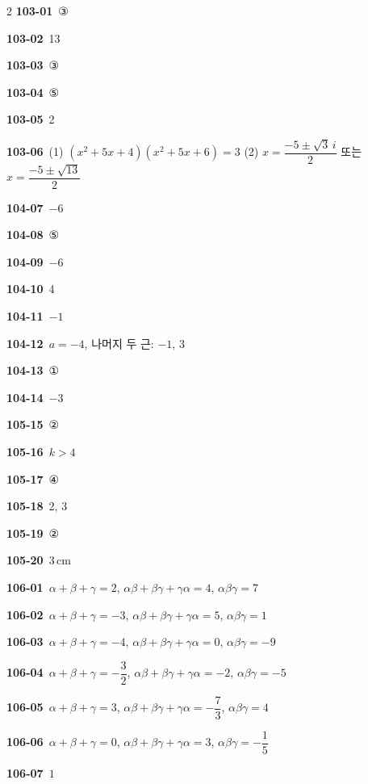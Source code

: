 \documentclass[10pt,a4paper]{article}
\begin{document}
\begin{multicols}{2}
\noindent\textbf{103-01}\ ③\par
\noindent\textbf{103-02}\ 13\par
\noindent\textbf{103-03}\ ③\par
\noindent\textbf{103-04}\ ⑤\par
\noindent\textbf{103-05}\ 2\par
\noindent\textbf{103-06}\ (1) $(x^2+5x+4)(x^2+5x+6)=3$ (2) $x=\dfrac{-5\pm\sqrt{3}\,i}{2}$ 또는 $x=\dfrac{-5\pm\sqrt{13}}{2}$\par
\noindent\textbf{104-07}\ $-6$\par
\noindent\textbf{104-08}\ ⑤\par
\noindent\textbf{104-09}\ $-6$\par
\noindent\textbf{104-10}\ 4\par
\noindent\textbf{104-11}\ $-1$\par
\noindent\textbf{104-12}\ $a=-4$, 나머지 두 근: $-1$, $3$\par
\noindent\textbf{104-13}\ ①\par
\noindent\textbf{104-14}\ $-3$\par
\noindent\textbf{105-15}\ ②\par
\noindent\textbf{105-16}\ $k>4$\par
\noindent\textbf{105-17}\ ④\par
\noindent\textbf{105-18}\ 2, 3\par
\noindent\textbf{105-19}\ ②\par
\noindent\textbf{105-20}\ $3\,\mathrm{cm}$\par
\noindent\textbf{106-01}\ $\alpha+\beta+\gamma=2$, $\alpha\beta+\beta\gamma+\gamma\alpha=4$, $\alpha\beta\gamma=7$\par
\noindent\textbf{106-02}\ $\alpha+\beta+\gamma=-3$, $\alpha\beta+\beta\gamma+\gamma\alpha=5$, $\alpha\beta\gamma=1$\par
\noindent\textbf{106-03}\ $\alpha+\beta+\gamma=-4$, $\alpha\beta+\beta\gamma+\gamma\alpha=0$, $\alpha\beta\gamma=-9$\par
\noindent\textbf{106-04}\ $\alpha+\beta+\gamma=-\dfrac{3}{2}$, $\alpha\beta+\beta\gamma+\gamma\alpha=-2$, $\alpha\beta\gamma=-5$\par
\noindent\textbf{106-05}\ $\alpha+\beta+\gamma=3$, $\alpha\beta+\beta\gamma+\gamma\alpha=-\dfrac{7}{3}$, $\alpha\beta\gamma=4$\par
\noindent\textbf{106-06}\ $\alpha+\beta+\gamma=0$, $\alpha\beta+\beta\gamma+\gamma\alpha=3$, $\alpha\beta\gamma=-\dfrac{1}{5}$\par
\noindent\textbf{106-07}\ $1$\par

\end{multicols}
\end{document}
